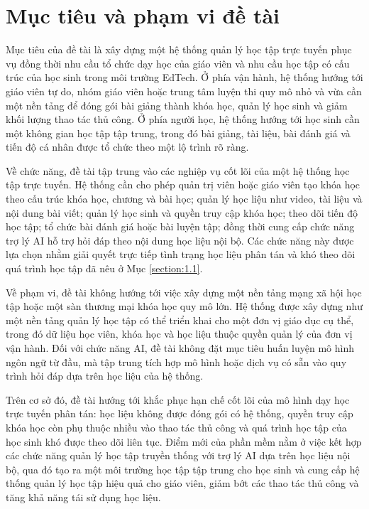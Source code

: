 \documentclass[../DoAn.tex]{subfiles}
\begin{document}
\section{Mục tiêu và phạm vi đề tài}
\label{section:1.2}

Mục tiêu của đề tài là xây dựng một hệ thống quản lý học tập trực tuyến phục vụ đồng thời nhu cầu tổ chức dạy học của giáo viên và nhu cầu học tập có cấu trúc của học sinh trong môi trường EdTech. Ở phía vận hành, hệ thống hướng tới giáo viên tự do, nhóm giáo viên hoặc trung tâm luyện thi quy mô nhỏ và vừa cần một nền tảng để đóng gói bài giảng thành khóa học, quản lý học sinh và giảm khối lượng thao tác thủ công. Ở phía người học, hệ thống hướng tới học sinh cần một không gian học tập tập trung, trong đó bài giảng, tài liệu, bài đánh giá và tiến độ cá nhân được tổ chức theo một lộ trình rõ ràng.

Về chức năng, đề tài tập trung vào các nghiệp vụ cốt lõi của một hệ thống học tập trực tuyến. Hệ thống cần cho phép quản trị viên hoặc giáo viên tạo khóa học theo cấu trúc khóa học, chương và bài học; quản lý học liệu như video, tài liệu và nội dung bài viết; quản lý học sinh và quyền truy cập khóa học; theo dõi tiến độ học tập; tổ chức bài đánh giá hoặc bài luyện tập; đồng thời cung cấp chức năng trợ lý AI hỗ trợ hỏi đáp theo nội dung học liệu nội bộ. Các chức năng này được lựa chọn nhằm giải quyết trực tiếp tình trạng học liệu phân tán và khó theo dõi quá trình học tập đã nêu ở Mục \ref{section:1.1}.

Về phạm vi, đề tài không hướng tới việc xây dựng một nền tảng mạng xã hội học tập hoặc một sàn thương mại khóa học quy mô lớn. Hệ thống được xây dựng như một nền tảng quản lý học tập có thể triển khai cho một đơn vị giáo dục cụ thể, trong đó dữ liệu học viên, khóa học và học liệu thuộc quyền quản lý của đơn vị vận hành. Đối với chức năng AI, đề tài không đặt mục tiêu huấn luyện mô hình ngôn ngữ từ đầu, mà tập trung tích hợp mô hình hoặc dịch vụ có sẵn vào quy trình hỏi đáp dựa trên học liệu của hệ thống.

Trên cơ sở đó, đề tài hướng tới khắc phục hạn chế cốt lõi của mô hình dạy học trực tuyến phân tán: học liệu không được đóng gói có hệ thống, quyền truy cập khóa học còn phụ thuộc nhiều vào thao tác thủ công và quá trình học tập của học sinh khó được theo dõi liên tục. Điểm mới của phần mềm nằm ở việc kết hợp các chức năng quản lý học tập truyền thống với trợ lý AI dựa trên học liệu nội bộ, qua đó tạo ra một môi trường học tập tập trung cho học sinh và cung cấp hệ thống quản lý học tập hiệu quả cho giáo viên, giảm bớt các thao tác thủ công và tăng khả năng tái sử dụng học liệu.
\end{document}
